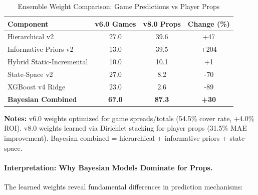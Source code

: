 \begin{table}[htbp]
\centering
\caption{Ensemble Weight Comparison: Game Predictions vs Player Props}
\label{tab:weight-comparison-domains}
\small
\begin{tabular}{@{} l S[table-format=2.1] S[table-format=2.1] S[table-format=+3.0] @{}}
\toprule
\textbf{Component} & {\textbf{v6.0 Games}} & {\textbf{v8.0 Props}} & {\textbf{Change (\%)}} \\
\midrule
Hierarchical v2 & 27.0 & 39.6 & +47 \\
Informative Priors v2 & 13.0 & 39.5 & +204 \\
Hybrid Static-Incremental & 10.0 & 10.1 & +1 \\
State-Space v2 & 27.0 & 8.2 & -70 \\
XGBoost v4 Ridge & 23.0 & 2.6 & -89 \\
\midrule
\textbf{Bayesian Combined} & \textbf{67.0} & \textbf{87.3} & \textbf{+30} \\
\bottomrule
\end{tabular}
\begin{tablenotes}
\item \textbf{Notes:} v6.0 weights optimized for game spreads/totals (54.5\% cover rate, +4.0\% ROI). v8.0 weights learned via Dirichlet stacking for player props (31.5\% MAE improvement). Bayesian combined = hierarchical + informative priors + state-space.
\end{tablenotes}
\end{table}

\paragraph{Interpretation: Why Bayesian Models Dominate for Props.}
The learned weights reveal fundamental differences in prediction mechanisms:

